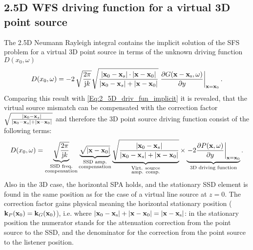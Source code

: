 \subsection{2.5D WFS driving function for a virtual 3D point source}
The 2.5D Neumann Rayleigh integral contains the implicit solution of the SFS problem for a virtual 3D point source in terms of the unknown driving function $D(x_0, \omega)$
\begin{equation}
D(x_0,\omega) = 
- 2\,\sqrt{\frac{2\pi}{\mathrm{j} k}} \sqrt{\frac{| \mathbf{x}_0 - \mathbf{x}_s |\cdot | \mathbf{x} - \mathbf{x}_0|  }{| \mathbf{x}_0 - \mathbf{x}_s | + | \mathbf{x} - \mathbf{x}_0| }} \left. \frac{\partial G(\mathbf{x}-\mathbf{x}_{\mathrm{s}},\omega)}{\partial y} \right|_{\mathbf{x} = \mathbf{x}_0}.
\label{Eq:2_5D_point_source_implicit_df}
\end{equation}
Comparing this result with \eqref{Eq:2_5D_driv_fun_implicit} it is revealed, that the virtual source mismatch can be compensated with the correction factor $\sqrt{\frac{| \mathbf{x}_0 - \mathbf{x}_s |  }{| \mathbf{x}_0 - \mathbf{x}_s | + | \mathbf{x} - \mathbf{x}_0| }}$ and therefore the 3D point source driving function consist of the following terms:
\begin{equation}
D(x_0,\omega) = 
\underbrace{\sqrt{\frac{2\pi}{\mathrm{j} k}}}_{\substack{\text{SSD freq.}\\\text{compensation}}} 
\underbrace{\sqrt{ | \mathbf{x} - \mathbf{x}_0|}}_{\substack{\text{SSD amp.}\\\text{compensation}}} 
\underbrace{\sqrt{\frac{| \mathbf{x}_0 - \mathbf{x}_s |  }{| \mathbf{x}_0 - \mathbf{x}_s | + | \mathbf{x} - \mathbf{x}_0| }}  }_
{\substack{\text{Virt. source}\\\text{amp. comp.}}}\times
\underbrace{ \left. -2 \frac{\partial P(\mathbf{x},\omega)}{\partial y}  \right|_{\mathbf{x} = \mathbf{x}_0}}_{\text{3D driving function}}.
\label{Eq:2_5D_point_source_implicit_df_Explanations}
\end{equation}
Also in the 3D case, the horizontal SPA holds, and the stationary SSD element is found in the same position as for the case of a virtual line source at $z=0$.
The correction factor gains physical meaning the horizontal stationary position ($\mathbf{k}_P(\mathbf{x}_0) = \mathbf{k}_G(\mathbf{x}_0)$), i.e. where $|\mathbf{x}_0-\mathbf{x}_{\mathrm{s}}| + |\mathbf{x} - \mathbf{x}_0| = |\mathbf{x}-\mathbf{x}_{\mathrm{s}}|$:
in the stationary position the numerator stands for the attenuation correction from the point source to the SSD, and the denominator for the correction from the point source to the listener position. 

